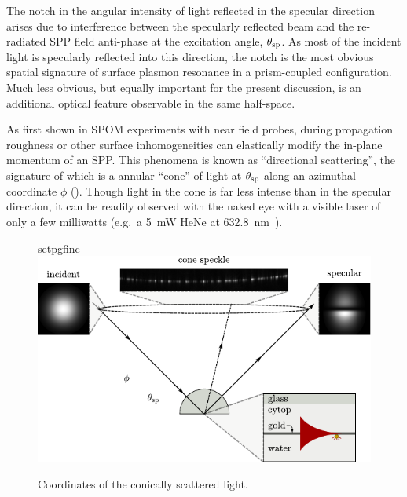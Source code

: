 The notch in the angular intensity of light reflected in the specular
direction arises due to interference between the specularly reflected beam
and the re-radiated SPP field anti-phase at the excitation angle,
$\theta_\mathrm{sp}$.  As most of the incident light is specularly reflected into
this direction, the notch is the most obvious spatial signature of surface
plasmon resonance in a prism-coupled configuration.  Much less obvious, but
equally important for the present discussion, is an additional optical
feature observable in the same half-space.

As first shown in SPOM experiments with near field probes, during propagation
roughness or other surface inhomogeneities can elastically modify the
in-plane momentum of an SPP\@.  This phenomena is known as ``directional
scattering'', the signature of which is a annular ``cone'' of light at
$\theta_\mathrm{sp}$ along an azimuthal coordinate $\phi$ ().
Though light in the cone is far less intense than in the specular
direction, it can be readily observed with the naked eye with a visible
laser of only a few milliwatts (e.g.\ a \SI{5}{\milli\watt} HeNe at
\SI{632.8}{\nano\meter}~\cite{schumann2009surface}).
\begin{figure}[ht]
 \centering
 {setpgfinc}
 \includegraphics{existence/figures/conefig}
 \caption{Coordinates of the conically scattered light.}
\label{fig:conefig}
\end{figure}


